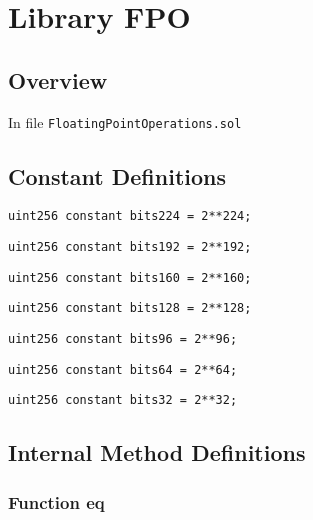 
\chapter{Library FPO}

\minitoc

\section{Overview}


In file {\tt FloatingPointOperations.sol}

\section{Constant Definitions}


\begin{lstlisting}[firstnumber=9]
    uint256 constant bits224 = 2**224;
\end{lstlisting}

\begin{lstlisting}[firstnumber=10]
    uint256 constant bits192 = 2**192;
\end{lstlisting}

\begin{lstlisting}[firstnumber=11]
    uint256 constant bits160 = 2**160;
\end{lstlisting}

\begin{lstlisting}[firstnumber=12]
    uint256 constant bits128 = 2**128;
\end{lstlisting}

\begin{lstlisting}[firstnumber=13]
    uint256 constant bits96 = 2**96;
\end{lstlisting}

\begin{lstlisting}[firstnumber=14]
    uint256 constant bits64 = 2**64;
\end{lstlisting}

\begin{lstlisting}[firstnumber=15]
    uint256 constant bits32 = 2**32;
\end{lstlisting}

\section{Internal Method Definitions}


\subsection{Function eq}

